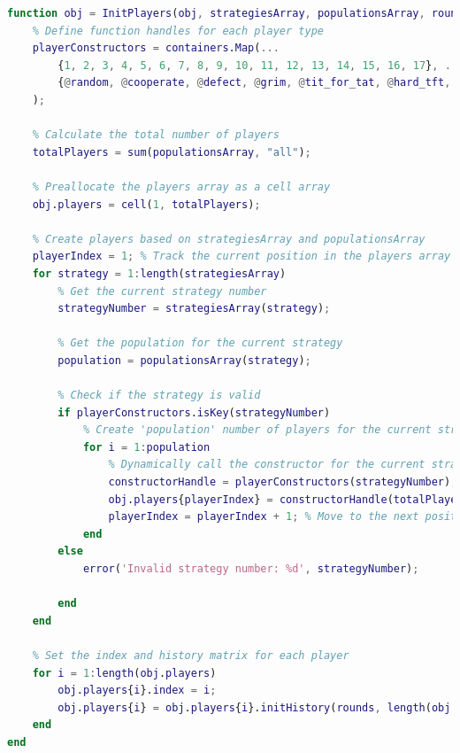 \documentclass[12pt]{article}
\begin{document}
\begin{lstlisting}[language=Matlab, caption={Full Rounding Logic Implementation}]
% Method to initialize players
function obj = InitPlayers(obj, strategiesArray, populationsArray, rounds)
    % Define function handles for each player type
    playerConstructors = containers.Map(...
        {1, 2, 3, 4, 5, 6, 7, 8, 9, 10, 11, 12, 13, 14, 15, 16, 17}, ... % Strategy numbers
        {@random, @cooperate, @defect, @grim, @tit_for_tat, @hard_tft, @slow_tft, @tf2t, @soft_majo, @per_cd, @per_kind, @per_nasty, @gradual, @pavlov, @mistrust, @per_ccccd, @prober} ... % Corresponding constructors
    );

    % Calculate the total number of players
    totalPlayers = sum(populationsArray, "all");

    % Preallocate the players array as a cell array
    obj.players = cell(1, totalPlayers);

    % Create players based on strategiesArray and populationsArray
    playerIndex = 1; % Track the current position in the players array
    for strategy = 1:length(strategiesArray)
        % Get the current strategy number
        strategyNumber = strategiesArray(strategy);
        
        % Get the population for the current strategy
        population = populationsArray(strategy);
        
        % Check if the strategy is valid
        if playerConstructors.isKey(strategyNumber)
            % Create 'population' number of players for the current strategy
            for i = 1:population
                % Dynamically call the constructor for the current strategy
                constructorHandle = playerConstructors(strategyNumber); % Get the function handle
                obj.players{playerIndex} = constructorHandle(totalPlayers); % Call the constructor to create a player object
                playerIndex = playerIndex + 1; % Move to the next position in the players array
            end
        else
            error('Invalid strategy number: %d', strategyNumber);

        end
    end

    % Set the index and history matrix for each player
    for i = 1:length(obj.players)
        obj.players{i}.index = i;
        obj.players{i} = obj.players{i}.initHistory(rounds, length(obj.players));
    end
end
\end{lstlisting}

\end{document}
